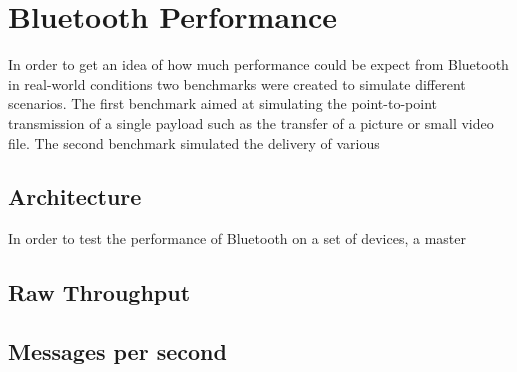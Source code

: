\chapter{Bluetooth Performance}
In order to get an idea of how much performance could be expect from Bluetooth in real-world conditions two benchmarks were created to simulate different scenarios.
The first benchmark aimed at simulating the point-to-point transmission of a single payload such as the transfer of a picture or small video file.
The second benchmark simulated the delivery of various 
\section{Architecture}
In order to test the performance of Bluetooth on a set of devices, a master 


\section{Raw Throughput}

\section{Messages per second}